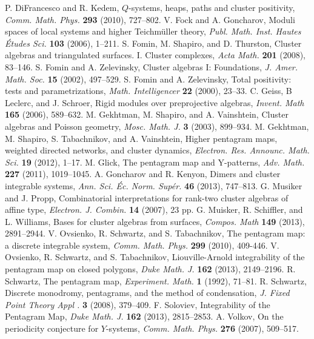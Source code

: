 \documentclass{amsart}
\theoremstyle{definition}
\theoremstyle{remark}
\numberwithin{equation}{section}
\begin{document}
\begin{thebibliography}{99}
	 P. DiFrancesco and R. Kedem, $Q$-systems, heaps, paths and cluster positivity, \textsl{Comm. Math. Phys.} \textbf{293} (2010), 727--802.
	 V. Fock and A. Goncharov, Moduli spaces of local systems and higher Teichmüller theory, \textsl{Publ. Math. Inst. Hautes Études Sci.} \textbf{103} (2006), 1--211.
	 S. Fomin, M. Shapiro, and D. Thurston, Cluster algebras and triangulated surfaces. I. Cluster complexes, \textsl{Acta Math.} \textbf{201} (2008), 83--146.
	 S. Fomin and A. Zelevinsky, Cluster algebras I: Foundations, \textsl{J. Amer. Math. Soc.} \textbf{15} (2002), 497--529.
	 S. Fomin and A. Zelevinsky, Total positivity: tests and parametrizations, \textsl{Math. Intelligencer} \textbf{22} (2000), 23--33.
	 C. Geiss, B Leclerc, and J. Schroer, Rigid modules over preprojective algebras, \textsl{Invent. Math} \textbf{165} (2006), 589--632.
	 M. Gekhtman, M. Shapiro, and A. Vainshtein,  Cluster algebras and Poisson geometry, \textsl{Mosc. Math. J.} \textbf{3} (2003), 899--934.
	 M. Gekhtman, M. Shapiro, S. Tabachnikov, and A. Vainshtein, Higher pentagram maps, weighted directed
 networks, and cluster dynamics, \textsl{Electron. Res. Announc. Math. Sci.} \textbf{19} (2012), 1--17.
	 M. Glick, The pentagram map and Y-patterns, \textsl{Adv. Math.} \textbf{227} (2011), 1019--1045.
	 A. Goncharov and R. Kenyon, Dimers and cluster integrable systems, \textsl{Ann. Sci. \'Ec. Norm. Sup\'er.} \textbf{46} (2013), 747--813.
	 G. Musiker and J. Propp, Combinatorial interpretations for rank-two cluster algebras of affine type, \textsl{ Electron. J. Combin.} \textbf{14} (2007), 23 pp.
	 G. Muisker, R. Schiffler, and L. Williams, Bases for cluster algebras from surfaces, \textsl{Compos. Math} \textbf{149} (2013), 2891--2944.
	 V. Ovsienko, R. Schwartz, and S. Tabachnikov, The pentagram map: a discrete integrable system, \textsl{Comm. Math. Phys.} \textbf{299} (2010), 409-446.
	 V. Ovsienko, R. Schwartz, and S. Tabachnikov, Liouville-Arnold integrability of the pentagram map on closed polygons, \textsl{Duke Math. J.} \textbf{162} (2013), 2149--2196.
	 R. Schwartz, The pentagram map, \textsl{Experiment. Math.} \textbf{1} (1992), 71--81.
	 R. Schwartz, Discrete monodromy, pentagrams, and the method of condensation, \textsl{J. Fixed Point Theory Appl
.} \textbf{3} (2008), 379--409.
	 F. Soloviev, Integrability of the Pentagram Map, \textsl{Duke Math. J.} \textbf{162} (2013), 2815--2853.
	 A. Volkov, On the periodicity conjecture for $Y$-systems, \textsl{Comm. Math. Phys.} \textbf{276} (2007), 509--517.
\end{thebibliography}
\end{document}

